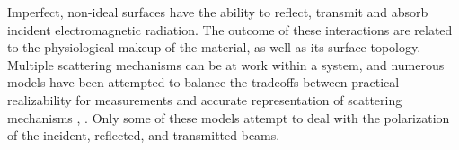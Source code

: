 Imperfect, non-ideal surfaces have the ability to reflect, transmit and absorb incident electromagnetic radiation.  The outcome of these interactions are related to the physiological makeup of the material, as well as its surface topology.  Multiple scattering mechanisms can be at work within a system, and numerous models have been attempted to balance the tradeoffs between practical realizability for measurements and accurate representation of scattering mechanisms \cite{priest}, \cite{pbrdf}.  Only some of these models attempt to deal with the polarization of the incident, reflected, and transmitted beams.
